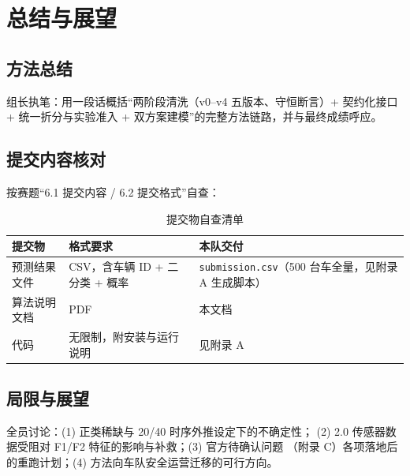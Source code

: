 \section{总结与展望}

\subsection{方法总结}

\begin{TODO}
组长执笔：用一段话概括“两阶段清洗（v0--v4 五版本、守恒断言）+ 契约化接口 +
统一折分与实验准入 + 双方案建模”的完整方法链路，并与最终成绩呼应。
\end{TODO}

\subsection{提交内容核对}

按赛题“6.1 提交内容 / 6.2 提交格式”自查：

\begin{table}[H]
\centering
\caption{提交物自查清单}
\label{tab:checklist}
\small
\begin{tabularx}{\textwidth}{lLL}
\toprule
提交物 & 格式要求 & 本队交付 \\
\midrule
预测结果文件 & CSV，含车辆 ID + 二分类 + 概率 & \texttt{submission.csv}（500 台车全量，见附录 A 生成脚本） \\
算法说明文档 & PDF & 本文档 \\
代码 & 无限制，附安装与运行说明 & 见附录 A \\
\bottomrule
\end{tabularx}
\end{table}

\subsection{局限与展望}

\begin{TODO}
全员讨论：(1) 正类稀缺与 20/40 时序外推设定下的不确定性；
(2) 2.0 传感器数据受阻对 F1/F2 特征的影响与补救；(3) 官方待确认问题
（附录 C）各项落地后的重跑计划；(4) 方法向车队安全运营迁移的可行方向。
\end{TODO}
